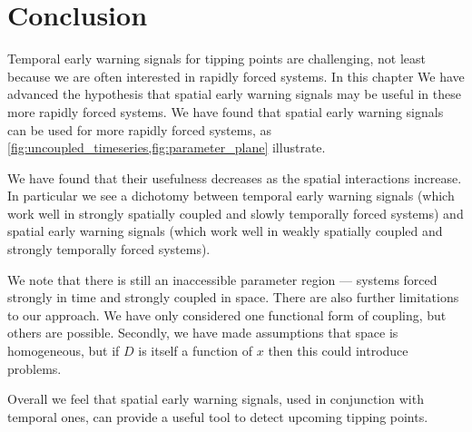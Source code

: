 \section{Conclusion}

Temporal early warning signals for tipping points are challenging, not least because we are often interested in rapidly forced systems. In this chapter
We have advanced the hypothesis that spatial early warning signals may be useful in these more rapidly forced systems.
We have found that spatial early warning signals can be used for more rapidly forced systems, as \cref{fig:uncoupled_timeseries,fig:parameter_plane}
illustrate.

We have found that their usefulness decreases as the spatial interactions increase.
In particular we see a dichotomy between temporal early warning signals (which work well in strongly spatially coupled and slowly temporally forced systems)
and spatial early warning signals (which work well in weakly spatially coupled and strongly temporally forced systems).

We note that there is still an inaccessible parameter region --- systems forced strongly in time and strongly coupled in space. There are also further limitations
to our approach.  We have only considered one functional form of coupling, but others are possible. Secondly, we have made
assumptions that space is homogeneous, but if $D$ is itself a function of $x$ then this could introduce problems.

Overall we feel that spatial early warning signals, used in conjunction with temporal ones, can provide a useful tool to detect upcoming tipping points.
